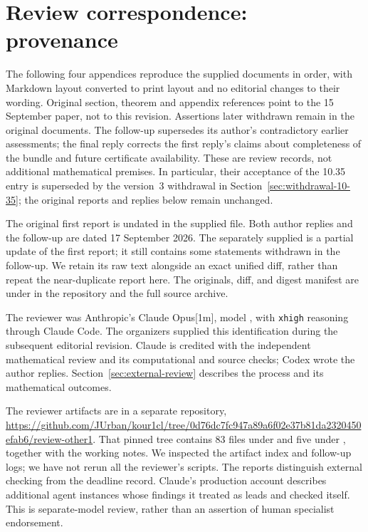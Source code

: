 \clearpage
\section{Review correspondence: provenance}
\label{app:review-provenance}
The following four appendices reproduce the supplied documents in order,
with Markdown layout converted to print layout and no editorial changes
to their wording. Original section, theorem and appendix references point
to the 15 September paper, not to this revision. Assertions later withdrawn
remain in the original documents. The follow-up supersedes its author's
contradictory earlier assessments; the final reply corrects the first reply's
claims about completeness of the bundle and future certificate availability.
These are review records, not additional mathematical premises.
In particular, their acceptance of the 10.35 entry is superseded by
the version~3 withdrawal in Section~\ref{sec:withdrawal-10-35}; the
original reports and replies below remain unchanged.

The original first report is undated in the supplied file. Both author
replies and the follow-up are dated 17 September 2026. The separately
supplied  is a partial update of the first report;
it still contains some statements withdrawn in the follow-up. We retain its
raw text alongside an exact unified diff, rather than repeat the near-duplicate
report here. The originals, diff, and digest manifest are under
 in the repository and the full source archive.

The reviewer was Anthropic's Claude Opus[1m], model
, with \texttt{xhigh} reasoning through
Claude Code. The organizers supplied this identification during the
subsequent editorial revision. Claude is credited with the independent
mathematical review and its computational and source checks; Codex wrote
the author replies. Section~\ref{sec:external-review} describes the process
and its mathematical outcomes.

The reviewer artifacts are in a separate repository,
\url{https://github.com/JUrban/kour1cl/tree/0d76dc7fc947a89a6f02e37b81da2320450efab6/review-other1}.
That pinned tree contains 83 files under  and five under
, together with the working notes. We inspected the
artifact index and follow-up logs; we have not rerun all the reviewer's
scripts. The reports distinguish external checking from the deadline record.
Claude's production account describes additional agent instances whose
findings it treated as leads and checked itself. This is separate-model
review, rather than an assertion of human specialist endorsement.

